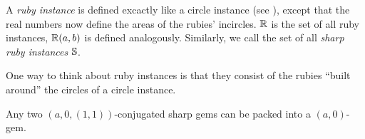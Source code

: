 \documentclass[a4paper,style=print,oneside,bibliography=totoc,nexus,lnum,extramargin]{tubsbook}
\begin{document}
\begin{definition}
    A \emph{ruby instance} is defined excactly like a circle instance (see ), except that the real numbers now define the areas of the rubies' incircles. $\mathbb{R}$ is the set of all ruby instances, $\mathbb{R}(a,b)$ is defined analogously.
    Similarly, we call the set of all \emph{sharp ruby instances} $\mathbb{S}$.
\end{definition}

One way to think about ruby instances is that they consist of the rubies “built around” the circles of a circle instance.

\begin{lemma}\label{th:gems-in-gem}
    Any two $(a, 0, (1,1))$-conjugated sharp gems can be packed into a $(a,0)$-gem.
\end{lemma}
\end{document}
